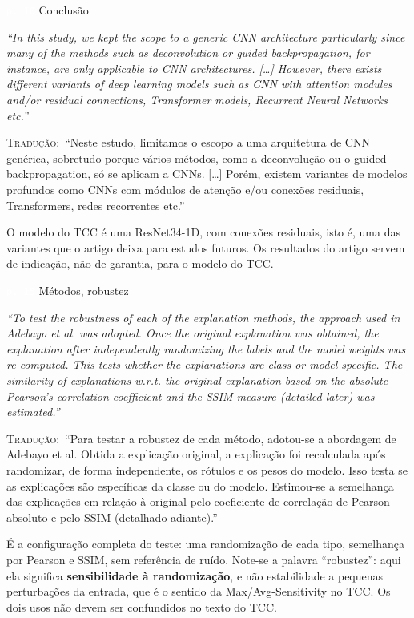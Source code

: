 \documentclass[11pt,a4paper]{article}
\newcommand{\pagechip}[1]{{\setlength{\fboxsep}{1.5pt}\colorbox{cAcc}{\textcolor{white}{\scriptsize\texttt{#1}}}}}
\newenvironment{origquote}{\par\itshape\small}{\par}
\newenvironment{tradquote}{\par\small\textsc{Tradução:}\ }{\par}
\newcommand{\explab}[1]{\par\smallskip{\small\color{cAcc}\textbf{\MakeUppercase{#1}}}\par}
\begin{document}
\begin{citacard}{\pagechip{p. 10} Conclusão}
\begin{origquote}“In this study, we kept the scope to a generic CNN architecture particularly since many of the methods such as deconvolution or guided backpropagation, for instance, are only applicable to CNN architectures. [\ldots] However, there exists different variants of deep learning models such as CNN with attention modules and/or residual connections, Transformer models, Recurrent Neural Networks etc.”\end{origquote}
\begin{tradquote}“Neste estudo, limitamos o escopo a uma arquitetura de CNN genérica, sobretudo porque vários métodos, como a deconvolução ou o guided backpropagation, só se aplicam a CNNs. [\ldots] Porém, existem variantes de modelos profundos como CNNs com módulos de atenção e/ou conexões residuais, Transformers, redes recorrentes etc.”\end{tradquote}
\explab{Explicação}
O modelo do TCC é uma ResNet34-1D, com conexões residuais, isto é, uma das variantes que o artigo deixa para estudos futuros. Os resultados do artigo servem de indicação, não de garantia, para o modelo do TCC.
\end{citacard}

\begin{citacard}{\pagechip{p. 15} Métodos, robustez}
\begin{origquote}“To test the robustness of each of the explanation methods, the approach used in Adebayo et al. was adopted. Once the original explanation was obtained, the explanation after independently randomizing the labels and the model weights was re-computed. This tests whether the explanations are class or model-specific. The similarity of explanations w.r.t. the original explanation based on the absolute Pearson’s correlation coefficient and the SSIM measure (detailed later) was estimated.”\end{origquote}
\begin{tradquote}“Para testar a robustez de cada método, adotou-se a abordagem de Adebayo et al. Obtida a explicação original, a explicação foi recalculada após randomizar, de forma independente, os rótulos e os pesos do modelo. Isso testa se as explicações são específicas da classe ou do modelo. Estimou-se a semelhança das explicações em relação à original pelo coeficiente de correlação de Pearson absoluto e pelo SSIM (detalhado adiante).”\end{tradquote}
\explab{Explicação}
É a configuração completa do teste: uma randomização de cada tipo, semelhança por Pearson e SSIM, sem referência de ruído. Note-se a palavra “robustez”: aqui ela significa \textbf{sensibilidade à randomização}, e não estabilidade a pequenas perturbações da entrada, que é o sentido da Max/Avg-Sensitivity no TCC. Os dois usos não devem ser confundidos no texto do TCC.
\end{citacard}
\end{document}
